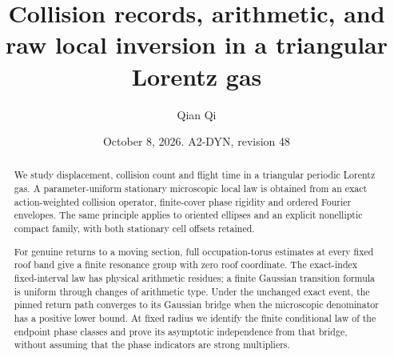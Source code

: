 \documentclass[11pt,reqno]{amsart}
\title[Collision records and raw local inversion]{Collision records, arithmetic, and raw local inversion in a triangular Lorentz gas}
\author{Qian Qi}
\date{October 8, 2026. A2-DYN, revision 48}
\numberwithin{equation}{section}
\theoremstyle{definition}\newtheorem{definition}[theorem]{Definition}
\theoremstyle{remark}\newtheorem{remark}[theorem]{Remark}
\begin{document}
\raggedbottom
\begin{abstract}
We study displacement, collision count and flight time in a triangular
periodic Lorentz gas. A parameter-uniform stationary microscopic local
law is obtained from an exact action-weighted collision operator,
finite-cover phase rigidity and ordered Fourier envelopes. The same
principle applies to oriented ellipses and an explicit nonelliptic
compact family, with both stationary cell offsets retained.

For genuine returns to a moving section, full occupation-torus
estimates at every fixed roof band give a finite resonance group with
zero roof coordinate. The exact-index fixed-interval law has physical
arithmetic residues; a finite Gaussian transition formula is uniform
through changes of arithmetic type. Under the unchanged exact event,
the pinned return path converges to its Gaussian bridge when the
microscopic denominator has a positive lower bound. At fixed radius
we identify the finite conditional law of the endpoint phase classes
and prove its asymptotic independence from that bridge, without
assuming that the phase indicators are strong multipliers.


\end{abstract}
\end{document}
